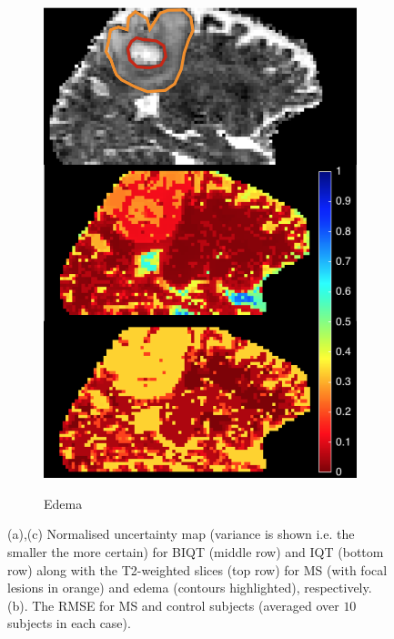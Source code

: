 \begin{figure}[ht]
\begin{subfigure}{0.245\linewidth}
			\label{fig:map3}
		\end{subfigure}
   		\begin{subfigure}{0.23\linewidth}
    		\caption{Edema}
    		\includegraphics[width=\textwidth]{chapter_2/figure_8.png}
    		\label{fig:map2}
    	\end{subfigure}
		\caption[Optional caption for list of figures]{(a),(c) Normalised uncertainty map (variance is shown i.e. the smaller the more certain) for BIQT (middle row) and IQT (bottom row) along with the T2-weighted slices (top row) for MS (with focal lesions in orange) and edema (contours highlighted), respectively. (b). The RMSE for MS and control subjects (averaged over $10$ subjects in each case).}
		\label{fig:sickbrains}
	\end{figure}
		
